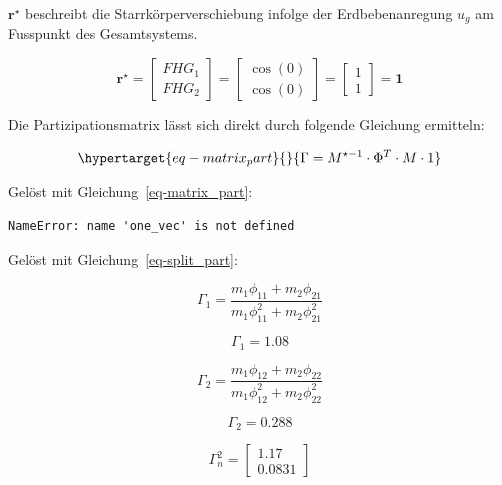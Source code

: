 \documentclass[
  letterpaper,
  DIV=11]{scrreprt}
\begin{document}
\(\mathbf{r^\star}\) beschreibt die Starrkörperverschiebung infolge der
Erdbebenanregung \(u_g\) am Fusspunkt des Gesamtsystems.

\[\mathbf{r^\star} = \begin{bmatrix}
FHG_1 \\
FHG_2 
\end{bmatrix}=
\begin{bmatrix}
\cos(0) \\
\cos(0) 
\end{bmatrix}=
\begin{bmatrix}
1 \\
1 
\end{bmatrix}= \mathbf{1}\]

Die Partizipationsmatrix lässt sich direkt durch folgende Gleichung
ermitteln:

\begin{equation}\protect\hypertarget{eq-matrix_part}{}{
\Gamma = M^{\star-1} \cdot \Phi^T \cdot M \cdot 1
}\label{eq-matrix_part}\end{equation}

Gelöst mit Gleichung~\ref{eq-matrix_part}:

\begin{verbatim}
NameError: name 'one_vec' is not defined
\end{verbatim}

Gelöst mit Gleichung~\ref{eq-split_part}:

\begin{equation*}\Gamma_{1} = \frac{m_{1} \phi_{11} + m_{2} \phi_{21}}{m_{1} \phi_{11}^{2} + m_{2} \phi_{21}^{2}}\end{equation*}

\begin{equation*}\Gamma_{1} = 1.08\end{equation*}

\begin{equation*}\Gamma_{2} = \frac{m_{1} \phi_{12} + m_{2} \phi_{22}}{m_{1} \phi_{12}^{2} + m_{2} \phi_{22}^{2}}\end{equation*}

\begin{equation*}\Gamma_{2} = 0.288\end{equation*}

\begin{equation*}\Gamma^{2}_{n} = \left[\begin{matrix}1.17\\0.0831\end{matrix}\right]\end{equation*}
\end{document}
